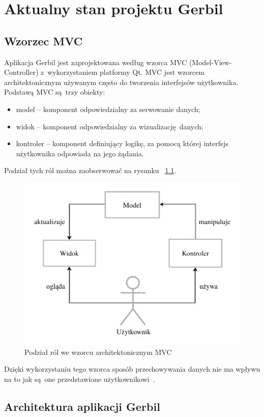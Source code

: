 \chapter{Aktualny stan projektu Gerbil}

 \section{Wzorzec MVC}

Aplikacja Gerbil jest zaprojektowana według wzorca MVC (Model-View-Controller) z~wykorzystaniem platformy Qt. MVC jest wzorcem architektonicznym używanym często do tworzenia interfejsów użytkownika. Podstawą MVC są trzy obiekty:
\begin{itemize}
	\item model -- komponent odpowiedzialny za serwowanie danych;
	\item widok -- komponent odpowiedzialny za wizualizację danych;
	\item kontroler -- komponent definiujący logikę, za pomocą której interfejs użytkownika odpowiada na jego żądania.
\end{itemize}
Podział tych ról można zaobserwować na rysunku ~\ref{fig:mvc}.

\begin{figure}[ht]
	\centering
	\includegraphics[width=0.7\linewidth]{rys04/mvc}
	\caption{Podział ról we wzorcu architektonicznym MVC}
	\label{fig:mvc}	
\end{figure}

Dzięki wykorzystaniu tego wzorca sposób przechowywania danych nie ma wpływu na to jak są one przedstawione użytkownikowi~\cite{Qtdoc}.

\section {Architektura aplikacji Gerbil}

